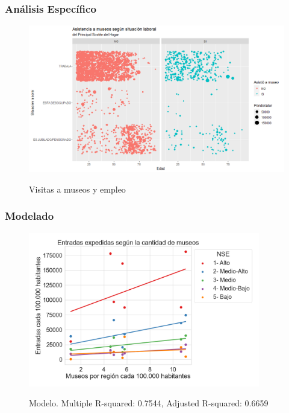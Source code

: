 \documentclass[10pt]{beamer}
\begin{document}
      \begin{frame}
        \frametitle{Análisis Específico}
    
      
        \begin{figure}
          \includegraphics[width=\textwidth]{situacion_psh.png}
          \label{fig:situacion_psh}
          \caption{Visitas a museos y empleo}
          \end{figure}
        \end{frame}

\begin{frame}
\frametitle{Modelado}

\begin{figure}
\centering
\includegraphics[width=0.9\textwidth]{modelo_entrada_museo}
\label{fig:modelo_entrada_museo}
\caption{Modelo. Multiple R-squared: 0.7544, Adjusted R-squared: 0.6659 }
\end{figure}

\end{frame}
\end{document}
